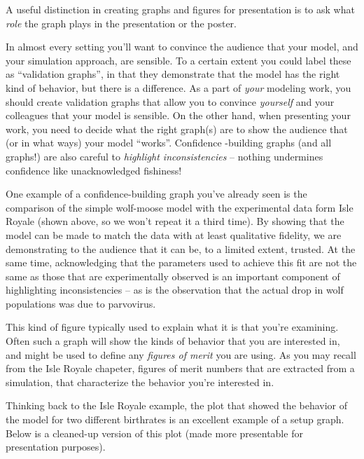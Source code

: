 A useful distinction in creating graphs and figures for presentation is to ask what {\it role} the graph plays in the presentation or the poster. 
 

  In almost every setting you'll want to convince the audience that your model, and your simulation approach, are sensible.  To a certain extent you could label these as ``validation graphs'', in that they demonstrate that the model has the right kind of behavior, but there is a difference.  As a part of {\it your} modeling work, you should create validation graphs that allow you to convince {\it yourself} and your colleagues that your model is sensible.  On the other hand, when presenting your work, you need to decide what the right graph(s) are to show the audience that (or in what ways) your model ``works''.   Confidence -building graphs (and all graphs!) are also careful to {\it highlight inconsistencies} -- nothing undermines confidence like unacknowledged fishiness!

One example of a confidence-building graph you've already seen is the comparison of the simple wolf-moose model with the experimental data form Isle Royale (shown above, so we won't repeat it a third time).  By showing that the model can be made to match the data with at least qualitative fidelity, we are demonstrating to the audience that it can be, to a limited extent, trusted.  At the same time, acknowledging that the parameters used to achieve this fit are not the same as those that are experimentally observed is an important component of highlighting inconsistencies -- as is the observation that the actual drop in wolf populations was due to parvovirus. 

  This kind of figure typically used to explain what it is that you're examining.  Often such a graph will show the kinds of behavior that you are interested in, and might be used to define any {\it figures of merit} you are using.  As you may recall from the Isle Royale chapeter, figures of merit numbers that are extracted from a simulation, that characterize the behavior you're interested in.

Thinking back to the Isle Royale example, the plot that showed the behavior of the model for two different birthrates is an excellent example of a setup graph.  Below is a cleaned-up version of this plot (made more presentable for presentation purposes).

